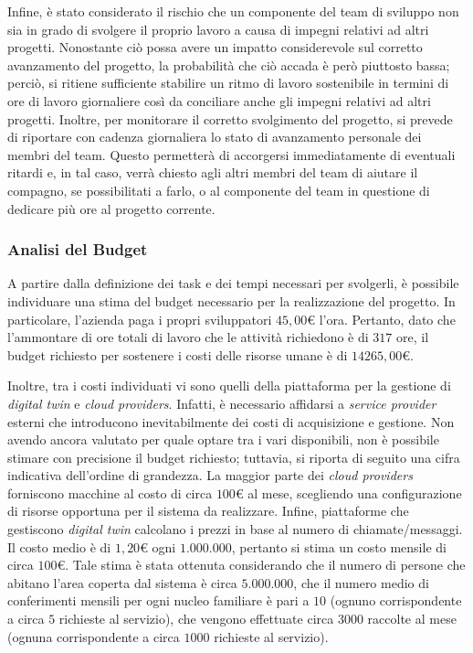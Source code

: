 Infine, è stato considerato il rischio che un componente del team di sviluppo non sia in grado di svolgere il proprio lavoro a causa di impegni relativi ad altri progetti.
Nonostante ciò possa avere un impatto considerevole sul corretto avanzamento del progetto, la probabilità che ciò accada è però piuttosto bassa; perciò, si ritiene sufficiente stabilire un ritmo di lavoro sostenibile in termini di ore di lavoro giornaliere così da conciliare anche gli impegni relativi ad altri progetti.
Inoltre, per monitorare il corretto svolgimento del progetto, si prevede di riportare con cadenza giornaliera lo stato di avanzamento personale dei membri del team.
Questo permetterà di accorgersi immediatamente di eventuali ritardi e, in tal caso, verrà chiesto agli altri membri del team di aiutare il compagno, se possibilitati a farlo, o al componente del team in questione di dedicare più ore al progetto corrente.

\subsubsection{Analisi del Budget}\label{sec:budget}
A partire dalla definizione dei task e dei tempi necessari per svolgerli, è possibile individuare una stima del budget necessario per la realizzazione del progetto.
In particolare, l'azienda paga i propri sviluppatori $45,00$\euro{} l'ora.
Pertanto, dato che l'ammontare di ore totali di lavoro che le attività richiedono è di $317$ ore, il budget richiesto per sostenere i costi delle risorse umane è di $14265,00$\euro{}.

Inoltre, tra i costi individuati vi sono quelli della piattaforma per la gestione di \textit{digital twin} e \textit{cloud providers}.
Infatti, è necessario affidarsi a \textit{service provider} esterni che introducono inevitabilmente dei costi di acquisizione e gestione.
Non avendo ancora valutato per quale optare tra i vari disponibili, non è possibile stimare con precisione il budget richiesto; tuttavia, si riporta di seguito una cifra indicativa dell'ordine di grandezza.
La maggior parte dei \textit{cloud providers} forniscono macchine al costo di circa $100$\euro{} al mese, scegliendo una configurazione di risorse opportuna per il sistema da realizzare.
Infine, piattaforme che gestiscono \textit{digital twin} calcolano i prezzi in base al numero di chiamate/messaggi.
Il costo medio è di $1,20$\euro{} ogni $1.000.000$, pertanto si stima un costo mensile di circa $100$\euro.
Tale stima è stata ottenuta considerando che il numero di persone che abitano l'area coperta dal sistema è circa $5.000.000$, che il numero medio di conferimenti mensili per ogni nucleo familiare è pari a $10$ (ognuno corrispondente a circa $5$ richieste al servizio), che vengono effettuate circa $3000$ raccolte al mese (ognuna corrispondente a circa $1000$ richieste al servizio).

